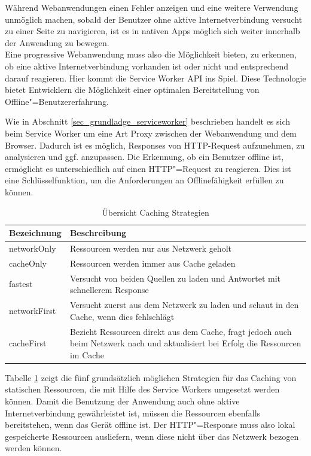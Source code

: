 Während Webanwendungen einen Fehler anzeigen und eine weitere Verwendung unmöglich machen, sobald der Benutzer ohne aktive Internetverbindung versucht zu einer Seite zu navigieren, ist es in nativen Apps möglich sich weiter innerhalb der Anwendung zu bewegen. \\
Eine progressive Webanwendung muss also die Möglichkeit bieten, zu erkennen, ob eine aktive Internetverbindung vorhanden ist oder nicht und entsprechend darauf reagieren. Hier kommt die Service Worker API ins Spiel. Diese Technologie bietet Entwicklern die Möglichkeit einer optimalen Bereitstellung von Offline"=Benutzererfahrung.   

Wie in Abschnitt \ref{sec_grundladge_serviceworker} beschrieben handelt es sich beim Service Worker um eine Art Proxy zwischen der Webanwendung und dem Browser. Dadurch ist es möglich, Responses von HTTP-Request aufzunehmen, zu analysieren und ggf. anzupassen. Die Erkennung, ob ein Benutzer offline ist, ermöglicht es unterschiedlich auf einen HTTP"=Request zu reagieren. Dies ist eine Schlüsselfunktion, um die Anforderungen an Offlinefähigkeit erfüllen zu können.\\

\begin{table}[h]
\def\arraystretch{1.5}%
\centering
\begin{tabularx}{\textwidth}{| l | X | }
    \hline
    \textbf{Bezeichnung} & \textbf{Beschreibung} \\
    \hline
    networkOnly & Ressourcen werden nur aus Netzwerk geholt \\
    \hline    
    cacheOnly & Ressourcen werden immer aus Cache geladen \\
    \hline
    fastest & Versucht von beiden Quellen zu laden und Antwortet mit schnellerem Response \\
    \hline
    networkFirst & Versucht zuerst aus dem Netzwerk zu laden und schaut in den Cache, wenn dies fehlschlägt \\
    \hline
    cacheFirst & Bezieht Ressourcen direkt aus dem Cache, fragt jedoch auch beim Netzwerk nach und aktualisiert bei Erfolg die Ressourcen im Cache \\
    \hline
\end{tabularx}
\caption{Übersicht Caching Strategien}
\label{tbl_konzeption_caching-strategien}
\end{table}

Tabelle \ref{tbl_konzeption_caching-strategien} zeigt die fünf grundsätzlich möglichen Strategien für das Caching von statischen Ressourcen, die mit Hilfe des Service Workers umgesetzt werden können. Damit die Benutzung der Anwendung auch ohne aktive Internetverbindung gewährleistet ist, müssen die Ressourcen ebenfalls bereitstehen, wenn das Gerät offline ist. Der HTTP"=Response muss also lokal gespeicherte Ressourcen ausliefern, wenn diese nicht über das Netzwerk bezogen werden können. \\

